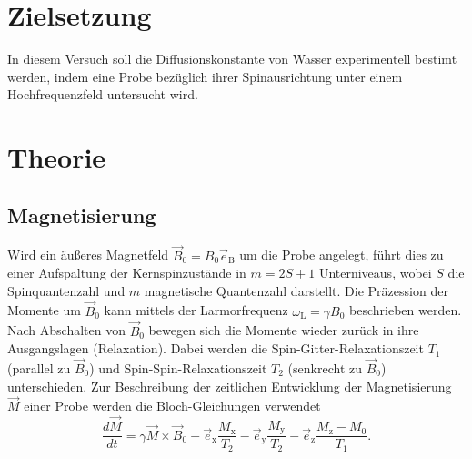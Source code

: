 \section{Zielsetzung}
\label{sec:Zielsetzung}

In diesem Versuch soll die Diffusionskonstante von Wasser experimentell bestimt werden,
indem eine Probe bezüglich ihrer Spinausrichtung unter einem Hochfrequenzfeld untersucht
wird. 

\section{Theorie}
\label{sec:Theorie}

\subsection{Magnetisierung}
\label{sec:Magnetisierung}

Wird ein äußeres Magnetfeld $\vec{B}_{\text{0}} = B_{\text{0}} \vec{e}_{\text{B}}$
um die Probe angelegt, führt dies zu einer
Aufspaltung der Kernspinzustände in $m = 2S+1$ Unterniveaus, wobei $S$ die Spinquantenzahl
und $m$ magnetische Quantenzahl darstellt. 
Die Präzession der Momente um $\vec{B}_{\text{0}}$ kann mittels der Larmorfrequenz 
$\omega_{\text{L}}= \gamma B_{\text{0}}$
beschrieben werden.
Nach Abschalten von $\vec{B}_{\text{0}}$ bewegen sich die Momente wieder zurück in 
ihre Ausgangslagen (Relaxation). 
Dabei werden die Spin-Gitter-Relaxationszeit $T_{\text{1}}$ 
(parallel zu $\vec{B}_{\text{0}}$) und Spin-Spin-Relaxationszeit $T_{\text{2}}$
(senkrecht zu $\vec{B}_{\text{0}}$) unterschieden.
Zur Beschreibung der zeitlichen Entwicklung der Magnetisierung $\vec{M}$ einer Probe 
werden die Bloch-Gleichungen verwendet 
\begin{equation}
    \frac{d \vec{M}}{dt} 
    = \gamma \vec{M} \times \vec{B}_{\text{0}} 
    - \vec{e}_{\text{x}} \frac{M_{\text{x}}}{T_{\text{2}}} 
    - \vec{e}_{\text{y}} \frac{M_{\text{y}}}{T_{\text{2}}} 
    - \vec{e}_{\text{z}} \frac{M_{\text{z}}-M_{\text{0}}}{T_{\text{1}}}.
  \label{eq3}
\end{equation}

